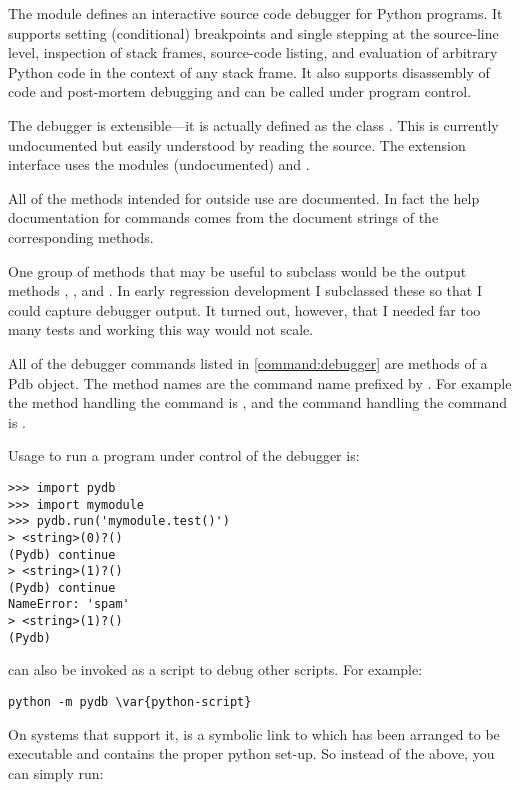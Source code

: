 The module  defines an interactive source code
debugger for Python programs.  It supports setting
(conditional) breakpoints and single stepping at the source-line
level, inspection of stack frames, source-code listing, and evaluation
of arbitrary Python code in the context of any stack frame.  It also
supports disassembly of code and post-mortem debugging and can be
called under program control.

The debugger is extensible---it is actually defined as the class
.
This is currently undocumented but easily understood by reading the
source.  The extension interface uses the modules
 (undocumented) and
.

All of the methods intended for outside use are documented. In fact
the help documentation for commands comes from the document strings of
the corresponding methods.

One group of methods that may be useful to subclass would be the
output methods , , and
. In early regression development I subclassed these
so that I could capture debugger output. It turned out, however, that
I needed far too many tests and working this way would not scale.

All of the debugger commands listed in \ref{command:debugger} are methods
of a Pdb object. The method names are the command name prefixed by
. For example the method handling the  command is
, and the command handling the  command is
. 

Usage to run a program under control of the debugger is:

\begin{verbatim}
>>> import pydb
>>> import mymodule
>>> pydb.run('mymodule.test()')
> <string>(0)?()
(Pydb) continue
> <string>(1)?()
(Pydb) continue
NameError: 'spam'
> <string>(1)?()
(Pydb) 
\end{verbatim}

 can also be invoked as
a script to debug other scripts.  For example:

\begin{verbatim}
python -m pydb \var{python-script}
\end{verbatim}

On systems that support it,  is a symbolic link to
 which has been arranged to be executable and contains
the proper python set-up. So instead of the above, you can
simply run:

